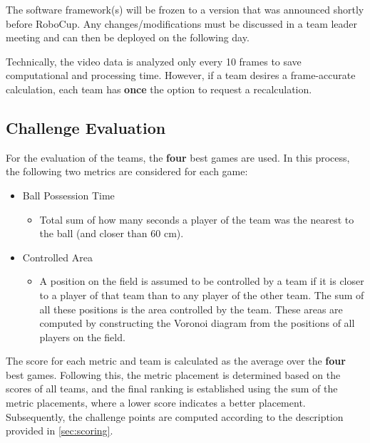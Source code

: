The software framework(s) will be frozen to a version that was announced shortly before RoboCup. Any changes/modifications must be discussed in a team leader meeting and can then be deployed on the following day.

Technically, the video data is analyzed only every 10 frames to save computational and processing time. However, if a team desires a frame-accurate calculation, each team has \textbf{once} the option to request a recalculation. 


\subsection{Challenge Evaluation}
\label{sec:vgs_evaluation}

For the evaluation of the teams, the \textbf{four} best games are used. In this process, the following two metrics are considered for each game:
\begin{itemize}
    \item Ball Possession Time 
    \begin{itemize}
        \item Total sum of how many seconds a player of the team was the nearest to the ball (and closer than 60 cm).
    \end{itemize}
    \item Controlled Area 
    \begin{itemize}
        \item A position on the field is assumed to be controlled by a team if it is closer to a player of that team than to any player of the other team. The sum of all these positions is the area controlled by the team. These areas are computed by constructing the Voronoi diagram from the positions of all players on the field.
    \end{itemize}
\end{itemize}

The score for each metric and team is calculated as the average over the \textbf{four} best games. Following this, the metric placement is determined based on the scores of all teams, and the final ranking is established using the sum of the metric placements, where a lower score indicates a better placement. Subsequently, the challenge points are computed according to the description provided in \cref{sec:scoring}.

